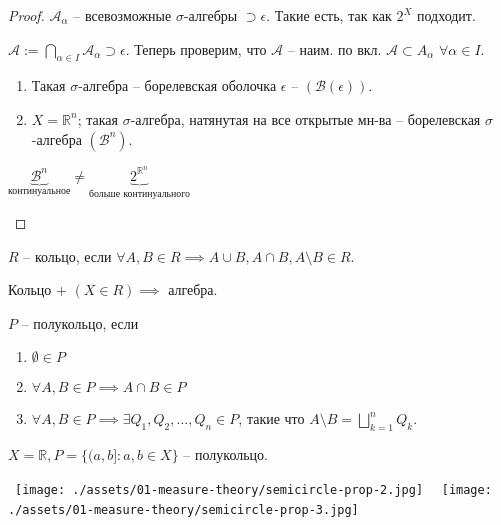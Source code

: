 \begin{proof}
    $\mathcal{A}_{\alpha}$ -- всевозможные $\sigma$-алгебры $\supset \epsilon$. Такие есть, так как $2^X$ подходит.

    $\mathcal{A} := \bigcap_{\alpha \in I} \mathcal{A}_{\alpha} \supset \epsilon$. Теперь проверим, что $\mathcal{A}$ -- наим. по вкл. $\mathcal{A} \subset A_{\alpha}$ $\forall \alpha \in I$.

    \begin{definition}
        \label{borel-shell}
        \begin{enumerate}
            \item Такая $\sigma$-алгебра -- борелевская оболочка $\epsilon$ -- $(\mathcal{B}(\epsilon))$.
            
            \item $X = \mathbb{R}^n$; такая $\sigma$-алгебра, натянутая на все открытые мн-ва -- борелевская $\sigma$-алгебра $(\mathcal{B}^n)$.
        \end{enumerate}
    \end{definition}

    \begin{remark}
        $\underbrace{\mathcal{B}^n}_{\text{континуальное}} \neq \underbrace{2^{\mathbb{R}^n}}_{\text{больше континуального}}$
    \end{remark}
\end{proof}

\begin{definition}
    $R$ -- кольцо, если $\forall A, B \in R \implies A \cup B, A \cap B, A \setminus B \in R$.
\end{definition}

\begin{remark}
    Кольцо + $(X \in R) \implies$ алгебра.
\end{remark}

\begin{definition}
    $P$ -- полукольцо, если 
    \begin{enumerate}
        \item $\emptyset \in P$
        \item $\forall A, B \in P \implies A \cap B \in P$
        \item $\forall A, B \in P \implies \exists Q_1, Q_2, \dots, Q_n \in P$, такие что $A \setminus B = \bigsqcup_{k = 1}^{n}Q_k$.
    \end{enumerate}
\end{definition}

\begin{example}
    $X = \mathbb{R}, P = \{(a, b] : a, b \in X\}$ -- полукольцо.

    \hbox{
        \texttt{[image: ./assets/01-measure-theory/semicircle-prop-2.jpg]}
    }
    \hbox{
        \texttt{[image: ./assets/01-measure-theory/semicircle-prop-3.jpg]}
    }

\end{example}

